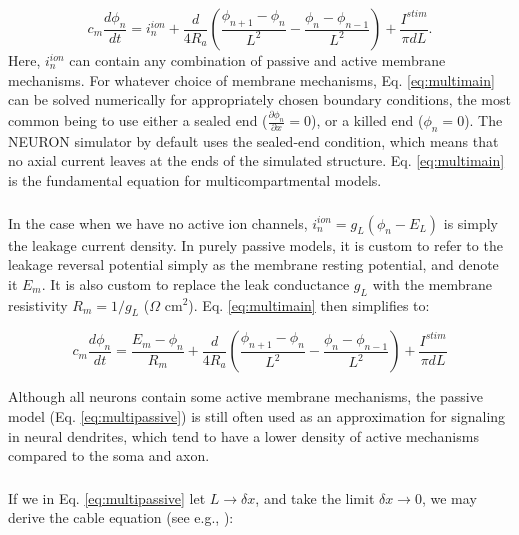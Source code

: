 \begin{equation}
c_m \frac{d\phi_n}{dt} = i_n^{ion} + \frac{d}{4R_a}\left(\frac{\phi_{n+1}-\phi_n}{L^2} - \frac{\phi_n-\phi_{n-1}}{L^2} \right) + \frac{I^{stim}}{\pi d L}.
\label{eq:multimain}
\end{equation}
Here,  $i_n^{ion}$ can contain any combination of passive and active membrane mechanisms. For whatever choice of membrane mechanisms, Eq. \ref{eq:multimain} can be solved numerically for appropriately chosen boundary conditions, the most common being to use either a sealed end ($\frac{\partial \phi_n}{\partial x} = 0$), or a killed end ($\phi_n=0$). The NEURON simulator by default uses the sealed-end condition, which means that no axial current leaves at the ends of the simulated structure. Eq. \ref{eq:multimain} is the fundamental equation for multicompartmental models.


\subsubsection{}
In the case when we have no active ion channels, $i_n^{ion} = g_L(\phi_n - E_L)$ is simply the leakage current density. In purely passive models, it is custom to refer to the leakage reversal potential simply as the membrane resting potential, and denote it $E_m$. It is also custom to replace the leak conductance $g_L$ with the membrane resistivity $R_m = 1/g_L$ ($\Omega$ cm$^2$). Eq. \ref{eq:multimain} then simplifies to:

\begin{equation}
c_m \frac{d\phi_n}{dt} = \frac{E_m-\phi_n}{R_m} + \frac{d}{4R_a}\left(\frac{\phi_{n+1}-\phi_n}{L^2} - \frac{\phi_n-\phi_{n-1}}{L^2} \right) + \frac{I^{stim}}{\pi d L}
\label{eq:multipassive}
\end{equation}

Although all neurons contain some active membrane mechanisms, the passive model (Eq. \ref{eq:multipassive}) is still often used as an approximation for signaling in neural dendrites, which tend to have a lower density of active mechanisms compared to the soma and axon. 


\subsubsection{}
If we in Eq. \ref{eq:multipassive} let $L \rightarrow \delta x$, and take the limit $\delta x \rightarrow 0$, we may derive the cable equation (see e.g., \cite{Sterratt2011}): 

